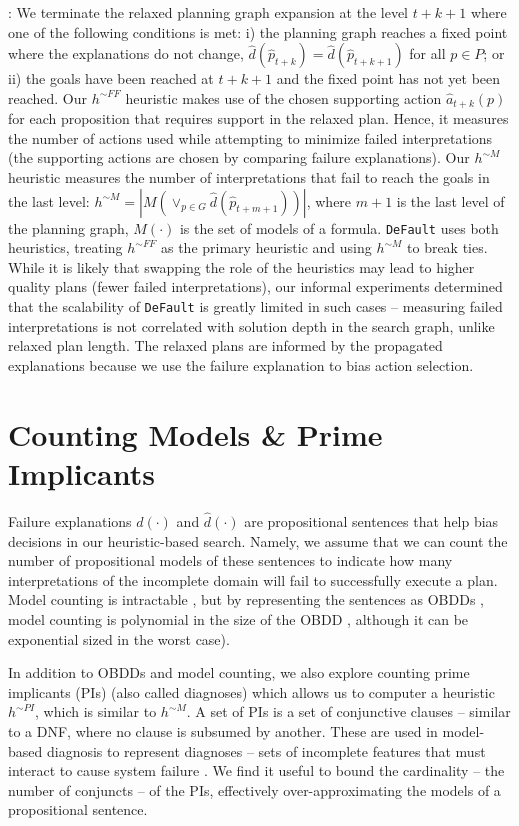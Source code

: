 \documentclass[letterpaper]{article}
\def\und#1{\noindent{\bf #1}:}
\def\default{{\tt DeFault}}
\def\citep#1{\cite{#1}}
\begin{document}
\und{Heuristic Computation}   We terminate the relaxed planning graph expansion
at the level $t+k+1$ where one of the following conditions is met: i) the
planning graph reaches a fixed point where the explanations do not change,
$\hat{d}(\hat{p}_{t+k}) = \hat{d}(\hat{p}_{t+k+1})$ for all $p\in P$; or ii) the
goals have been reached at $t+k+1$ and the fixed point has not yet been reached.
Our $h^{\sim FF}$ heuristic makes use of the chosen supporting action
$\hat{a}_{t+k}(p)$ for each proposition that requires support in the relaxed
plan. Hence, it measures the number of actions used while attempting to
minimize failed interpretations (the supporting actions are chosen by comparing
failure explanations). Our $h^{\sim M}$ heuristic measures the number of
interpretations that fail to reach the goals in the last level: 
$h^{\sim M} = |M(\vee_{p \in G} \hat{d}(\hat{p}_{t+m+1}))|$, where $m+1$ is the
last level of the planning graph, $M(\cdot)$ is the set of models of a formula.
\default{} uses both heuristics, treating $h^{\sim FF}$ as the primary heuristic
and using $h^{\sim M}$ to break ties. While it is likely that swapping the role
of the heuristics may lead to higher quality plans (fewer failed
interpretations), our informal experiments determined that the scalability of
\default{} is greatly limited in such cases -- measuring failed interpretations
is not correlated with solution depth in the search graph, unlike relaxed plan
length.  The relaxed plans are informed by the propagated explanations because
we use the failure explanation to bias action selection.

\section{Counting Models \& Prime Implicants }

Failure explanations $d(\cdot)$ and $\hat{d}(\cdot)$ are propositional sentences
that help bias decisions in our heuristic-based search.  Namely, we assume that
we can count the number of propositional models of these sentences to indicate how
many interpretations of the incomplete domain will fail to successfully execute
a plan.  Model counting is intractable \citep{Roth96}, but by representing the
sentences as OBDDs \citep{bryant-ieeetc86}, model counting is polynomial in the
size of the OBDD \citep{darwiche}, although it can be exponential sized in
the worst case).

In addition to OBDDs and model counting, we also explore counting prime
implicants (PIs) (also called diagnoses) which allows us to computer a
heuristic $h^{\sim PI}$, which is similar to $h^{\sim M}$. A set of PIs is a set
of conjunctive clauses -- similar to a DNF, where no clause is subsumed by
another. These are used in model-based diagnosis to represent diagnoses -- sets
of incomplete features that must interact to cause system failure
\citep{dekleer}.  We find it useful to bound the cardinality -- the number of
conjuncts -- of the PIs, effectively over-approximating the models of a
propositional sentence.
\end{document}
